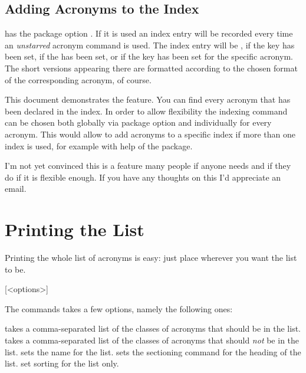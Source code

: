 \documentclass[DIV10,toc=index,toc=bib,hyperfootnotes=false]{cnpkgdoc}
\makeatletter
\providecommand*\sinceversion[1]{%
  \@bsphack
  \marginnote{%
    \footnotesize\sffamily\RaggedRight
    \textcolor{black!75}{Introduced in version~#1}}%
  \@esphack}
\providecommand*\changedversion[1]{%
  \@bsphack
  \marginnote{%
    \footnotesize\sffamily\RaggedRight
    \textcolor{black!75}{Changed in version~#1}}%
  \@esphack}
\makeatother
\begin{document}
\subsection{Adding Acronyms to the Index}\label{ssec:index}
\noindent\sinceversion{1.1}\acro has the package option . If it is
used an index entry will be recorded every time an \emph{unstarred} acronym
command is used. The index entry will be , 
if the  key has been set,  if the
 has been set, or  if the key  has been
set for the specific acronym. The short versions appearing there are formatted
according to the chosen format of the corresponding acronym, of course.

This document demonstrates the feature. You can find every acronym that has been
declared in the index. In order to allow flexibility the indexing command can be
chosen both globally via package option and individually for every acronym. This
would allow to add acronyms to a specific index if more than one index is used,
for example with help of the  package.

I'm not yet convinced this is a feature many people if anyone needs and if they
do if it is flexible enough. If you have any thoughts on this I'd appreciate an
email.

\section{Printing the List}\label{sec:print_lists}
\noindent\changedversion{1.0}Printing the whole list of acronyms is easy: just
place  wherever you want the list to be.
\begin{beschreibung}
 [<options>]
\end{beschreibung}
The commands takes a few options, namely the following ones:
\begin{beschreibung}
 \newline
   takes a comma-separated list of the classes of acronyms that should be in the
   list.
 \newline
   takes a comma-separated list of the classes of acronyms that should \emph{not}
   be in the list.
 \newline
   sets the name for the list.
   \changedversion{1.3}sets the sectioning command for the heading of the list.
   \sinceversion{1.3}set sorting for the list only.
\end{beschreibung}
\begin{beispiel}
 \printacronyms[exclude-classes=city]

 \printacronyms[include-classes=city,name={City Acronyms}]
\end{beispiel}
\printacronyms[exclude-classes=city]
\end{document}
